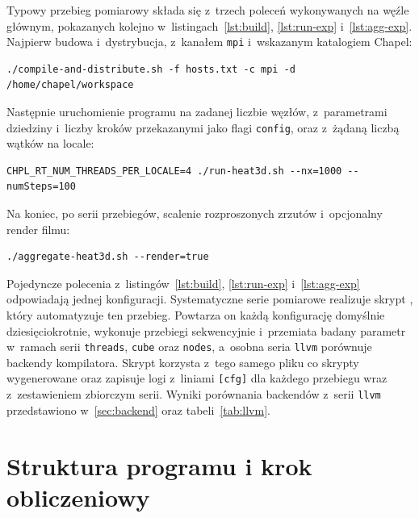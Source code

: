 Typowy przebieg pomiarowy składa się z~trzech poleceń wykonywanych na węźle
głównym, pokazanych kolejno w~listingach~\ref{lst:build}, \ref{lst:run-exp}
i~\ref{lst:agg-exp}. Najpierw budowa i~dystrybucja, z~kanałem \texttt{mpi} i~wskazanym
katalogiem Chapel:

\begin{lstlisting}[style=bash, caption={Budowa i~rozesłanie plików wykonywalnych na klaster.}, label={lst:build}]
./compile-and-distribute.sh -f hosts.txt -c mpi -d /home/chapel/workspace
\end{lstlisting}

Następnie uruchomienie programu na zadanej liczbie węzłów, z~parametrami
dziedziny i~liczby kroków przekazanymi jako flagi \texttt{config}, oraz z~żądaną
liczbą wątków na locale:

\begin{lstlisting}[style=bash, caption={Uruchomienie przebiegu pomiarowego.}, label={lst:run-exp}]
CHPL_RT_NUM_THREADS_PER_LOCALE=4 ./run-heat3d.sh --nx=1000 --numSteps=100
\end{lstlisting}

Na koniec, po serii przebiegów, scalenie rozproszonych zrzutów i~opcjonalny
render filmu:

\begin{lstlisting}[style=bash, caption={Agregacja rozproszonych fragmentów i~wizualizacja.}, label={lst:agg-exp}]
./aggregate-heat3d.sh --render=true
\end{lstlisting}

Pojedyncze polecenia z~listingów~\ref{lst:build}, \ref{lst:run-exp} i~\ref{lst:agg-exp}
odpowiadają jednej konfiguracji. Systematyczne serie pomiarowe realizuje skrypt
, który automatyzuje ten przebieg. Powtarza on każdą konfigurację domyślnie
dziesięciokrotnie, wykonuje przebiegi sekwencyjnie i~przemiata badany parametr w~ramach serii
\texttt{threads}, \texttt{cube} oraz \texttt{nodes}, a~osobna seria \texttt{llvm} porównuje
backendy kompilatora. Skrypt korzysta z~tego samego pliku  co skrypty
wygenerowane oraz zapisuje logi z~liniami \texttt{[cfg]} dla każdego przebiegu wraz
z~zestawieniem zbiorczym serii. Wyniki porównania backendów z~serii \texttt{llvm}
przedstawiono w~\cref{sec:backend} oraz tabeli~\ref{tab:llvm}.

\section{Struktura programu i krok obliczeniowy}
\label{sec:solver}

